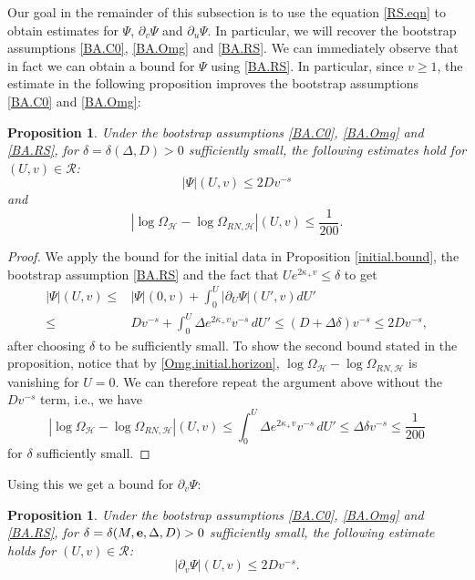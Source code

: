\documentclass[10pt, reqno]{amsart}
\newtheorem{proposition}[theorem]{Proposition}
\theoremstyle{definition}
\theoremstyle{remark}
\numberwithin{equation}{section}
\newcommand{\rd}{\partial}
\newcommand{\0}{\emptyset}
\newcommand{\Omg}{\Omega}
\newcommand{\f}{\frac}
\newcommand{\de}{\delta}
\begin{document}
Our goal in the remainder of this subsection is to use the equation \eqref{RS.eqn} to obtain estimates for $\Psi$, $\rd_v\Psi$ and $\rd_u\Psi$. In particular, we will recover the bootstrap assumptions \eqref{BA.C0}, \eqref{BA.Omg} and \eqref{BA.RS}. We can immediately observe that in fact we can obtain a bound for $\Psi$ using \eqref{BA.RS}. In particular, since $v\geq 1$, the estimate in the following proposition improves the bootstrap assumptions \eqref{BA.C0} and \eqref{BA.Omg}:
\begin{proposition}\label{RS.P}
Under the bootstrap assumptions \eqref{BA.C0}, \eqref{BA.Omg} and \eqref{BA.RS}, for $\de=\de(\Delta,D)>0$ sufficiently small, the following estimates hold for $(U,v)\in \mathcal R$:
$$|\Psi|(U,v)\leq 2D v^{-s}$$
and 
$$|\log\Omg_{\mathcal H}-\log \Omg_{RN,\mathcal H}|(U,v)\leq \f 1{200}.$$
\end{proposition}
\begin{proof}
We apply the bound for the initial data in Proposition \ref{initial.bound}, the bootstrap assumption \eqref{BA.RS} and the fact that $Ue^{2\kappa_+ v}\leq \de$ to get
\begin{equation*}
\begin{split}
|\Psi|(U,v)\leq &|\Psi|(0,v)+\int_0^U |\rd_U\Psi|(U',v) dU' \\
\leq &Dv^{-s}+\int_0^U \Delta e^{2\kappa_+ v} v^{-s}\,dU' \leq (D+\Delta\de) v^{-s}\leq 2Dv^{-s},
\end{split}
\end{equation*}
after choosing $\de$ to be sufficiently small. To show the second bound stated in the proposition, notice that by \eqref{Omg.initial.horizon}, $\log\Omg_{\mathcal H}-\log \Omg_{RN,\mathcal H}$ is vanishing for $U=0$. We can therefore repeat the argument above without the $Dv^{-s}$ term, i.e., we have
$$|\log\Omg_{\mathcal H}-\log \Omg_{RN,\mathcal H}|(U,v)\leq \int_0^U \Delta e^{2\kappa_+ v} v^{-s}\,dU' \leq \Delta\de v^{-s}\leq \f{1}{200}$$
for $\de$ sufficiently small.
\end{proof}
Using this we get a bound for $\rd_v\Psi$:
\begin{proposition}\label{RS.rvP}
Under the bootstrap assumptions \eqref{BA.C0}, \eqref{BA.Omg} and \eqref{BA.RS}, for $\de=\de(M,{\bf e},\Delta,D)>0$ sufficiently small, the following estimate holds for $(U,v)\in \mathcal R$:
$$|\rd_v\Psi|(U,v)\leq 2D v^{-s}.$$
\end{proposition}
\end{document}
